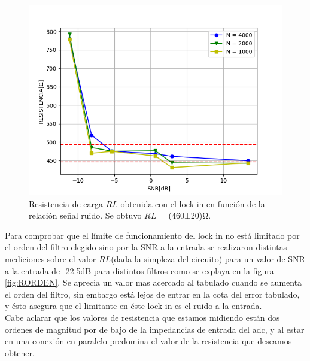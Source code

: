 \documentclass[11pt,a4paper]{extarticle}
\begin{document}
\begin{multicols}{2}
\begin{figure}[H]
	\centering
	\includegraphics[width=\linewidth]{Images/RvsSNR(segunda).png}
	\caption{Resistencia de carga $RL$ obtenida con 
	el lock in en función
	de la relación señal ruido. Se obtuvo 
	$RL$ = (460±20)Ω.}
	\label{fig:RvsSNR}
\end{figure}

Para comprobar que el límite de funcionamiento 
del lock in no está limitado por el orden del 
filtro elegido sino por la SNR a la entrada
se realizaron distintas mediciones 
sobre el valor $RL$(dada la simpleza del circuito) 
para un valor de SNR a la entrada de -22.5dB para 
distintos filtros como se explaya en la figura 
\ref{fig:RORDEN}. Se aprecia un valor mas acercado 
al tabulado cuando se aumenta el orden del filtro, sin 
embargo está lejos de entrar en la cota del error 
tabulado, y ésto asegura que el limitante en éste 
lock in es el ruido a la entrada.\\

Cabe aclarar que los valores de resistencia que estamos
 midiendo están dos ordenes de magnitud por de 
 bajo de la impedancias de entrada del adc, y al estar en 
una conexión en paralelo predomina el valor de la resistencia 
que deseamos obtener.\\


\end{multicols}
\end{document}
